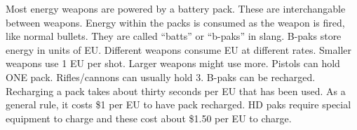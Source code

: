 Most energy weapons are powered by a battery pack.  These are interchangable between weapons.  Energy within the packs is consumed as the weapon is fired, like normal bullets.  They are called ``batts'' or ``b-paks'' in slang. B-paks store energy in units of EU.  Different weapons consume EU at different rates.  Smaller weapons use 1 EU per shot.  Larger weapons might use more.  Pistols can hold ONE pack.  Rifles/cannons can usually hold 3. B-paks can be recharged.  Recharging a pack takes about thirty seconds per EU that has been used.  As a general rule, it costs \$1 per EU to have pack recharged.  HD paks require special equipment to charge and these cost about \$1.50 per EU to charge.								